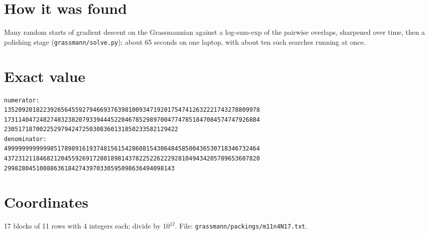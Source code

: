 \documentclass[11pt,a4paper]{article}
\begin{document}
\section{How it was found}
Many random starts of gradient descent on the Grassmannian against a log-sum-exp of the pairwise overlaps, sharpened over time, then a polishing stage (\texttt{grassmann/solve.py}); about 65 seconds on one laptop, with about ten such searches running at once.


\appendix
\section{Exact value}
{\small
\begin{verbatim}
numerator:
135209201822392656455927946693763981009347192017547412632221743278809978
173114047248274832382079339444522046785298970047747851847084574747926884
2305171870022529794247250308360131850233582129422
denominator:
499999999999985178989161937481561542860815430648458500436530718346732464
437231211846821204559269172801898143782252262229281049434205789653607820
299828045100886361842743970330595098636494098143
\end{verbatim}}

\section{Coordinates}
17 blocks of 11 rows with 4 integers each; divide by $10^{12}$. File: \texttt{grassmann/packings/m11n4N17.txt}.
{\tiny
\begin{multicols}{3}
\end{multicols}}
\end{document}
